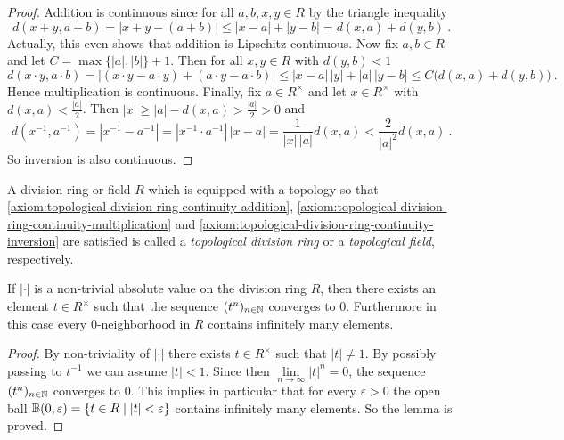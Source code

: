 \begin{proof}
   Addition is continuous since  for all $a,b,x,y \in R$ by the triangle inequality
   \[ d ( x + y , a+ b ) = | x + y -( a+ b)| \leq | x-a| + | y-b| = d(x,a) + d(y,b)\ .\] 
   Actually, this even shows  that addition is Lipschitz continuous. 
   Now fix $a,b \in R$ and let $C = \max \{ |a|,|b| \} + 1$. Then for all $x,y \in R$ 
   with $d(y,b) <  1$
   \[ d ( x \cdot y , a \cdot b ) = | (x \cdot y - a \cdot y) + (a \cdot y - a \cdot b)| 
   \leq | x-a| \, |y|  + |a| \, | y-b| \leq C \big(  d(x,a) + d(y,b) \big) \ .\] 
   Hence multiplication is continuous.
   Finally, fix $a \in R^\times$ and let $x \in R^\times $ with $d(x,a) <  \frac{|a|}{2}$. Then 
   $|x| \geq |a| - d(x,a) > \frac{|a|}{2} >0$ and
   \[ d \left( x^{-1} , a^{-1} \right) =  \left|  x^{-1} - a^{-1} \right| = \left|  x^{-1} \cdot a^{-1} \right| 
   \, | x-a | = \frac{1}{|x| \, |a|} d( x,a ) <  \frac{2}{|a|^2} d( x,a )  \ .\] 
   So inversion is also continuous.
\end{proof}

\begin{definition}
 A division ring or field $R$ which is equipped with a topology so that 
 \ref{axiom:topological-division-ring-continuity-addition},
 \ref{axiom:topological-division-ring-continuity-multiplication} and
 \ref{axiom:topological-division-ring-continuity-inversion} are satisfied is called a
 \emph{topological division ring} or a \emph{topological field}, respectively.
\end{definition} 

\begin{lemma}\label{thm:zero-neighborhood-topological-division-ring-infinite}
  If $|\cdot|$ is a non-trivial absolute value on the division ring $R$, then there exists an element
  $t\in R^\times$ such that the sequence $(t^n)_{n\in\mathbb{N}}$ converges to $0$. Furthermore in this case
  every $0$-neighborhood in $R$ contains infinitely many elements.
\end{lemma}
\begin{proof}
  By non-triviality of $|\cdot|$ there exists $t\in R^\times$ such that $|t|\neq 1$. By possibly
  passing to $t^{-1}$ we can assume $|t|<1$. Since then $\lim\limits_{n\to\infty} |t|^n =0$,
  the sequence $(t^n)_{n\in\mathbb{N}}$ converges to $0$.  This implies in particular that 
  for every $\varepsilon >0$ the open ball $\mathbb{B} (0,\varepsilon) =\{t \in R \mid |t| < \varepsilon \}$
  contains infinitely many elements. So the lemma is proved. 
\end{proof}



